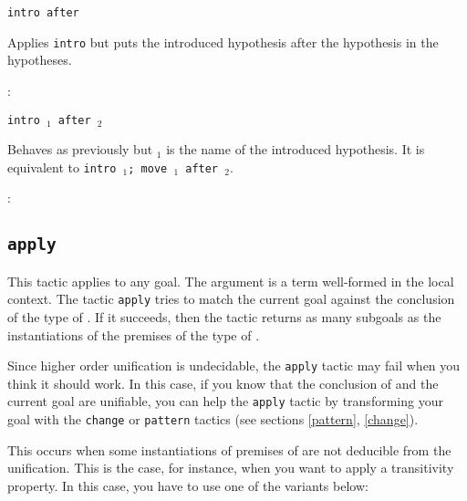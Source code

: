 \begin{Variants}
\item {\tt intro after \ident} 

  Applies {\tt intro} but puts the introduced
  hypothesis after the hypothesis \ident{} in the hypotheses.

\begin{ErrMsgs}
\item {}
\item {} : {\ident}
\end{ErrMsgs}

\item {\tt intro \ident$_1$ after \ident$_2$}
  
  Behaves as previously but \ident$_1$ is the name of the introduced
  hypothesis.  It is equivalent to {\tt intro \ident$_1$; move
    \ident$_1$ after \ident$_2$}.

\begin{ErrMsgs}
\item {}
\item {} : {\ident}
\end{ErrMsgs}

\end{Variants}

\subsection{\tt apply \term}
\label{apply}

This tactic applies to any goal.  The argument {\term} is a term
well-formed in the local context.  The tactic {\tt apply} tries to
match the current goal against the conclusion of the type of {\term}.
If it succeeds, then the tactic returns as many subgoals as the
instantiations of the premises of the type of {\term}.

\begin{ErrMsgs}
\item {} 

  Since higher order unification is undecidable, the {\tt apply}
  tactic may fail when you think it should work.  In this case, if you
  know that the conclusion of {\term} and the current goal are
  unifiable, you can help the {\tt apply} tactic by transforming your
  goal with the {\tt change} or {\tt pattern} tactics (see sections
  \ref{pattern}, \ref{change}).

\item {}

  This occurs when some instantiations of premises of {\term} are not
  deducible from the unification. This is the case, for instance, when
  you want to apply a transitivity property. In this case, you have to
  use one of the variants below:

\end{ErrMsgs}

